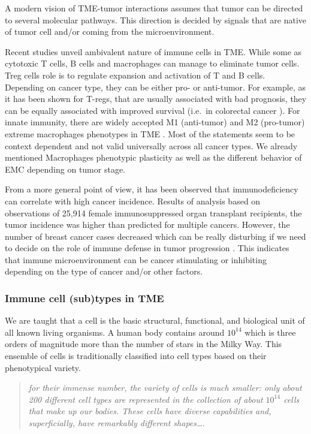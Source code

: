 \documentclass[12pt,]{book}
\theoremstyle{definition}
\theoremstyle{definition}
\theoremstyle{definition}
\theoremstyle{remark}
\begin{document}
A modern vision of TME-tumor interactions assumes that tumor can be
directed to several molecular pathways. This direction is decided by
signals that are native of tumor cell and/or coming from the
microenvironment.

Recent studies unveil ambivalent nature of immune cells in TME. While
some as cytotoxic T cells, B cells and macrophages can manage to
eliminate tumor cells. Treg cells role is to regulate expansion and
activation of T and B cells. Depending on cancer type, they can be
either pro- or anti-tumor. For example, as it has been shown for T-regs,
that are usually associated with bad prognosis, they can be equally
associated with improved survival (i.e.~in colorectal cancer
\citep{Frey2010}). For innate immunity, there are widely accepted M1
(anti-tumor) and M2 (pro-tumor) extreme macrophages phenotypes in TME
\citep{Qian2010}. Most of the statements seem to be context dependent
and not valid universally across all cancer types. We already mentioned
Macrophages phenotypic plasticity as well as the different behavior of
EMC depending on tumor stage.

From a more general point of view, it has been observed that
immunodeficiency can correlate with high cancer incidence. Results of
analysis based on observations of 25,914 female immunosuppressed organ
transplant recipients, the tumor incidence was higher than predicted for
multiple cancers. However, the number of breast cancer cases decreased
which can be really disturbing if we need to decide on the role of
immune defense in tumor progression \citep{Stewart1995}. This indicates
that immune microenvironment can be cancer stimulating or inhibiting
depending on the type of cancer and/or other factors.

\hypertarget{immune-cell-subtypes-in-tme}{%
\subsubsection{Immune cell (sub)types in
TME}\label{immune-cell-subtypes-in-tme}}

We are taught that a cell is the basic structural, functional, and
biological unit of all known living organisms. A human body contains
around \(10^{14}\) which is three orders of magnitude more than the
number of stars in the Milky Way. This ensemble of cells is
traditionally classified into cell types based on their phenotypical
variety.

\begin{quote}
\emph{for their immense number, the variety of cells is much smaller:
only about 200 different cell types are represented in the collection of
about \(10^{14}\) cells that make up our bodies. These cells have
diverse capabilities and, superficially, have remarkably different
shapes\ldots{}.} \citet{Boal2002}
\end{quote}
\end{document}
